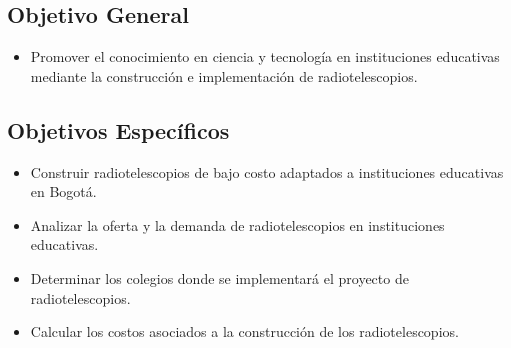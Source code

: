 \subsection{Objetivo General}
\begin{itemize}
    \item Promover el conocimiento en ciencia y tecnología en instituciones educativas mediante la
    construcción e implementación de radiotelescopios.
\end{itemize}

\subsection{Objetivos Específicos}
\begin{itemize}
    \item  Construir radiotelescopios de bajo costo adaptados a instituciones educativas en Bogotá.
     \item Analizar la oferta y la demanda de radiotelescopios en instituciones educativas.
    \item Determinar los colegios donde se implementará el proyecto de radiotelescopios.
    \item Calcular los costos asociados a la construcción de los radiotelescopios.
\end{itemize}
